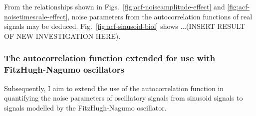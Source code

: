 From the relationships shown in Figs.\ \ref{fig:acf-noiseamplitude-effect} and \ref{fig:acf-noisetimescale-effect}, noise parameters from the autocorrelation functions of real signals may be deduced.
Fig.\ \ref{fig:acf-sinusoid-biol} shows ...(INSERT RESULT OF NEW INVESTIGATION HERE).


\subsubsection{The autocorrelation function extended for use with FitzHugh-Nagumo oscillators}
\label{subsubsec:analysis-characterisation-acf-fhn}

Subsequently, I aim to extend the use of the autocorrelation function in quantifying the noise parameters of oscillatory signals from sinusoid signals to signals modelled by the FitzHugh-Nagumo oscillator.

